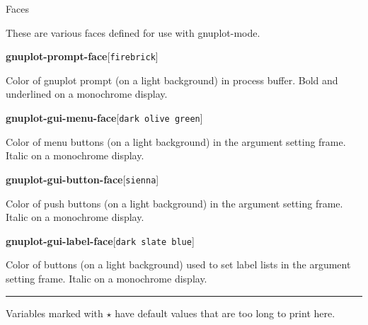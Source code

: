 \documentclass[twocolumn]{article}
\newenvironment{Boxedminipage}%
{\begin{Sbox}\begin{minipage}}%
  {\end{minipage}\end{Sbox}\Ovalbox{\TheSbox}}
\def\variable#1#2#3{{
    \vspace{-0.2truecm}
    \begin{flushright}
      \begin{minipage}[h]{0.97\linewidth}
        \vspace{-0.2truecm}
        \textbf{#1}\hfill[\texttt{#2}]
        \begin{flushright}
          \begin{minipage}[h]{0.93\linewidth}
            \vspace{-0.2truecm}
            #3
          \end{minipage}
        \end{flushright}
      \end{minipage}
    \end{flushright}
    }}
\def\Star{{$\star$}}
\begin{document}
\vfill\eject

\begin{center}
  \begin{Boxedminipage}{0.75\linewidth}
    \begin{center}
      {\large Faces}
    \end{center}
  \end{Boxedminipage}
\end{center}

\noindent These are various faces defined for use with gnuplot-mode.
\vspace{2ex}

%
\variable{gnuplot-prompt-face}{firebrick}{Color of gnuplot prompt (on a
  light background) in process buffer.  Bold and underlined on a
  monochrome display.}
%
\variable{gnuplot-gui-menu-face}{dark olive green}{Color of menu
  buttons (on a light background) in the argument setting frame.
  Italic on a monochrome display.}
%
\variable{gnuplot-gui-button-face}{sienna}{Color of push buttons (on a
  light background) in the argument setting frame.  Italic on a
  monochrome display.}
%
\variable{gnuplot-gui-label-face}{dark slate blue}{Color of buttons (on
  a light background) used to set label lists in the argument setting
  frame.  Italic on a monochrome display.}
%

\vfill
\hrule
\vspace{0.5ex}
\begin{flushleft}
  \footnotesize{Variables marked with {\Star} have default values that
    are too long to print here.}
\end{flushleft}
\end{document}
